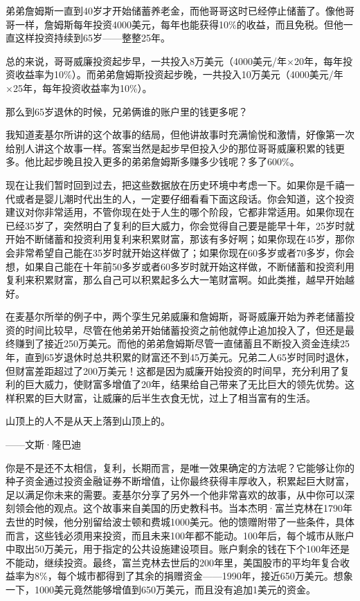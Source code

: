 弟弟詹姆斯一直到40岁才开始储蓄养老金，而他哥哥这时已经停止储蓄了。像他哥哥一样，詹姆斯每年投资4000美元，每年也能获得10\%的收益，而且免税。但他一直这样投资持续到65岁——整整25年。

总的来说，哥哥威廉投资起步早，一共投入8万美元（4000美元/年×20年，每年投资收益率为10\%）。而弟弟詹姆斯投资起步晚，一共投入10万美元（4000美元/年×25年，每年投资收益率为10\%）。

那么到65岁退休的时候，兄弟俩谁的账户里的钱更多呢？

我知道麦基尔所讲的这个故事的结局，但他讲故事时充满愉悦和激情，好像第一次给别人讲这个故事一样。答案当然是起步早但投入少的那位哥哥威廉积累的钱更多。他比起步晚且投入更多的弟弟詹姆斯多赚多少钱呢？多了600\%。

现在让我们暂时回到过去，把这些数据放在历史环境中考虑一下。如果你是千禧一代或者是婴儿潮时代出生的人，一定要仔细看看下面这段话。你会知道，这个投资建议对你非常适用，不管你现在处于人生的哪个阶段，它都非常适用。如果你现在已经35岁了，突然明白了复利的巨大威力，你会觉得自己要是能早十年，25岁时就开始不断储蓄和投资利用复利来积累财富，那该有多好啊；如果你现在45岁，那你会非常希望自己能在35岁时就开始这样做了；如果你现在60多岁或者70多岁，你会想，如果自己能在十年前50多岁或者60多岁时就开始这样做，不断储蓄和投资利用复利来积累财富，那么自己可以积累起多么大一笔财富啊。如此类推，越早开始越好。

在麦基尔所举的例子中，两个孪生兄弟威廉和詹姆斯，哥哥威廉开始为养老储蓄投资的时间比较早，尽管在他弟弟开始储蓄投资之前他就停止追加投入了，但还是最终赚到了接近250万美元。而他的弟弟詹姆斯尽管一直储蓄且不断投入资金连续25年，直到65岁退休时总共积累的财富还不到45万美元。兄弟二人65岁时同时退休，但财富差距超过了200万美元！这都是因为威廉开始投资的时间早，充分利用了复利的巨大威力，使财富多增值了20年，结果给自己带来了无比巨大的领先优势。这样积累的巨大财富，让威廉的后半生衣食无忧，过上了相当富有的生活。

\begin{BookQuote}
山顶上的人不是从天上落到山顶上的。

\hfill ——文斯·隆巴迪
\end{BookQuote}

你是不是还不太相信，复利，长期而言，是唯一效果确定的方法呢？它能够让你的种子资金通过投资金融证券不断增值，让你最终获得丰厚收入，积累起巨大财富，足以满足你未来的需要。麦基尔分享了另外一个他非常喜欢的故事，从中你可以深刻领会他的观点。这个故事来自美国的历史教科书。当本杰明·富兰克林在1790年去世的时候，他分别留给波士顿和费城1000美元。他的馈赠附带了一些条件，具体而言，这些钱必须用来投资，而且未来100年都不能动。100年后，每个城市从账户中取出50万美元，用于指定的公共设施建设项目。账户剩余的钱在下个100年还是不能动，继续投资。最终，富兰克林去世后的200年里，美国股市的平均年复合收益率为8\%，每个城市都得到了其余的捐赠资金——1990年，接近650万美元。想象一下，1000美元竟然能够增值到650万美元，而且没有追加1美元的资金。


